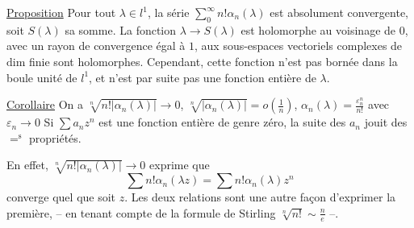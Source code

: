 \uline{Proposition} Pour tout $\lambda\in l^1$, la série $\sum_0^\infty n!\alpha_n(\lambda)$
est absolument convergente, soit $S(\lambda)$ sa somme.
La fonction $\lambda\to S(\lambda)$ est holomorphe au voisinage
de $0$, avec un rayon de convergence égal à $1$,
  aux sous-espaces vectoriels
complexes de $\mathrm{dim}$ finie sont holomorphes.
Cependant,  cette fonction n'est pas bornée
dans la boule unité de $l^1$, et n'est par
suite pas une fonction entière de $\lambda$.

\uline{Corollaire} On a  $\sqrt[n]{n!|\alpha_n(\lambda)|}\to 0$,
$\sqrt[n]{|\alpha_n(\lambda)|}=o\left(\frac{1}{n}\right)$, $\alpha_n(\lambda)=\frac{\varepsilon_n^n}{n!}$ avec $\varepsilon_n\to 0$
Si $\sum a_nz^n$ est une fonction entière de
genre zéro, la suite des $a_n$ jouit
des $=^{\mathrm s}$ propriétés.

En effet, $\sqrt[n]{n!|\alpha_n(\lambda)|}\to 0$ exprime que
\[ \sum n!\alpha_n(\lambda z)=\sum n!\alpha_n(\lambda)z^n \]
converge
quel que soit $z$. Les deux  relations
 sont une autre façon d'exprimer la première,
-- en tenant compte de la formule de
Stirling $\sqrt[n]{n!}\sim\frac{n}{e}$ --.

